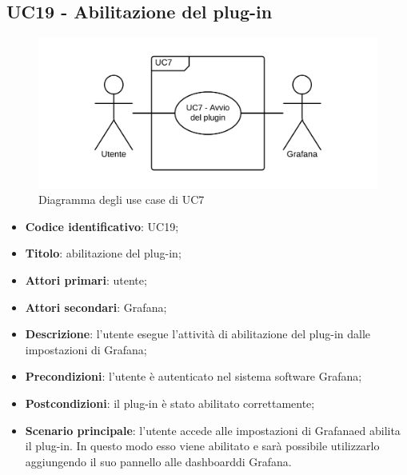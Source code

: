 \subsection{UC19 - Abilitazione del plug-in}
\begin{figure}[H]
	\includegraphics{img/UC7_-_Avvio_plugin.png}
	\caption{Diagramma degli use case di UC7}
\end{figure}
\begin{itemize}
	\item \textbf{Codice identificativo}: UC19;
	\item \textbf{Titolo}: abilitazione del plug-in;
	\item \textbf{Attori primari}: utente;
	\item \textbf{Attori secondari}: Grafana\glo;
	\item \textbf{Descrizione}: l'utente esegue l'attività di abilitazione del plug-in dalle impostazioni di Grafana\glo;
	\item \textbf{Precondizioni}: l'utente è autenticato nel sistema software Grafana\glo;
	\item \textbf{Postcondizioni}: il plug-in è stato abilitato correttamente;
	\item \textbf{Scenario principale}: l'utente accede alle impostazioni di Grafana\glosp ed abilita il plug-in. In questo modo esso viene abilitato e sarà possibile utilizzarlo aggiungendo il suo pannello alle dashboard\glosp di Grafana\glo.
\end{itemize}

